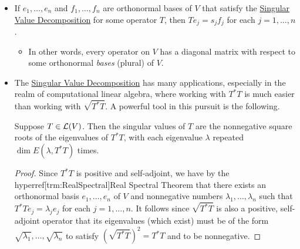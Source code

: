 \documentclass[../main.tex]{subfiles}
\begin{document}
\begin{itemize}
\begin{theorem}
\begin{proof}
\begin{align*}
                &= s_1\inp{v}{e_1}Se_1+\cdots+s_n\inp{v}{e_n}Se_n\\
                &= s_1\inp{v}{e_1}f_1+\cdots+s_n\inp{v}{e_n}f_n\tag*{Theorem \ref{trm:isomConditions}}
            \end{align*}
            where $s_1,\dots,s_n$ are the singular values of $T$ (the eigenvalues of $\sqrt{T^*T}$) and $f_1,\dots,f_n$ is another orthonormal basis of $V$.
        \end{proof}
    \end{theorem}
    \item If $e_1,\dots,e_n$ and $f_1,\dots,f_n$ are orthonormal bases of $V$ that satisfy the \hyperref[trm:SVD]{Singular Value Decomposition} for some operator $T$, then $Te_j=s_jf_j$ for each $j=1,\dots,n$.
    \begin{itemize}
        \item In other words, every operator on $V$ has a diagonal matrix with respect to some orthonormal \emph{bases} (plural) of $V$.
    \end{itemize}
    \item The \hyperref[trm:SVD]{Singular Value Decomposition} has many applications, especially in the realm of computational linear algebra, where working with $T^*T$ is much easier than working with $\sqrt{T^*T}$. A powerful tool in this pursuit is the following.
    \begin{theorem}
        Suppose $T\in\mathcal{L}(V)$. Then the singular values of $T$ are the nonnegative square roots of the eigenvalues of $T^*T$, with each eigenvalue $\lambda$ repeated $\dim E(\lambda,T^*T)$ times.
        \begin{proof}
            Since $T^*T$ is positive and self-adjoint, we have by the hyperref[trm:RealSpectral]{Real} Spectral Theorem that there exists an orthonormal basis $e_1,\dots,e_n$ of $V$ and nonnegative numbers $\lambda_1,\dots,\lambda_n$ such that $T^*Te_j=\lambda_je_j$ for each $j=1,\dots,n$. It follows since $\sqrt{T^*T}$ is also a positive, self-adjoint operator that its eigenvalues (which exist) must be of the form $\sqrt{\lambda_1},\dots,\sqrt{\lambda_n}$ to satisfy $(\sqrt{T^*T})^2=T^*T$ and to be nonnegative.
        \end{proof}
    \end{theorem}
\end{itemize}
\end{document}
